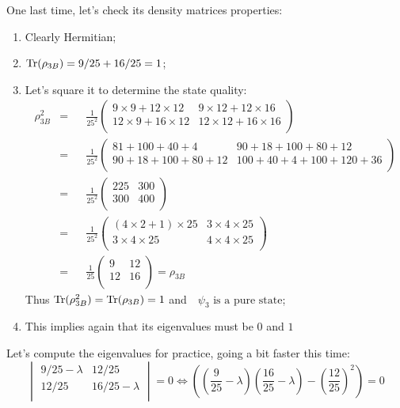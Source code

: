 \documentclass[solutions.tex]{subfiles}
\begin{document}
One last time, let's check its density matrices properties:
\begin{enumerate}
	\item Clearly Hermitian;
	\item $\text{Tr}(\rho_{3B}) = 9/25 + 16/25 = 1$;
	\item Let's square it to determine the state quality:
	\begin{equation*}\begin{aligned}
		\rho_{3B}^2 &=&& \frac{1}{25^2}\begin{pmatrix}
			9\times9 + 12\times12 & 9\times12 + 12\times16 \\
			12\times9 + 16\times12 & 12\times12 + 16\times16 \\
		\end{pmatrix} \\
		~ &=&& \frac{1}{25^2}\begin{pmatrix}
			81 + 100 + 40 + 4 & 90+18 + 100 + 80 + 12 \\
			90+18 + 100 + 80 + 12 & 100 + 40 + 4 + 100 + 120 + 36 \\
		\end{pmatrix} \\
		~ &=&& \frac{1}{25^2}\begin{pmatrix}
			225 & 300 \\
			300 & 400 \\
		\end{pmatrix} \\
		~ &=&& \frac{1}{25^2}\begin{pmatrix}
			(4\times2+1)\times25 & 3\times4\times25 \\
			3\times4\times25 & 4\times4\times25 \\
		\end{pmatrix} \\
		~ &=&& \frac1{25}\begin{pmatrix}
			9 & 12 \\
			12 & 16 \\
		\end{pmatrix} = \rho_{3B}
	\end{aligned}\end{equation*}
	Thus $\text{Tr}(\rho_{3B}^2) = \text{Tr}(\rho_{3B}) = 1$ and
	$\boxed{\text{ $\psi_3$ is a pure state}}$;
	\item This implies again that its eigenvalues must be $0$ and $1$
\end{enumerate}
Let's compute the eigenvalues for practice, going a bit faster this
time:
\[
	\begin{vmatrix}
		9/25-\lambda & 12/25 \\
		12/25 & 16/25-\lambda \\
	\end{vmatrix} = 0 \Leftrightarrow
	\left(
		\left(\frac{9}{25}-\lambda\right)
			\left(\frac{16}{25}-\lambda\right)
		- \left(\frac{12}{25}\right)^2\right) = 0
\]
\end{document}
